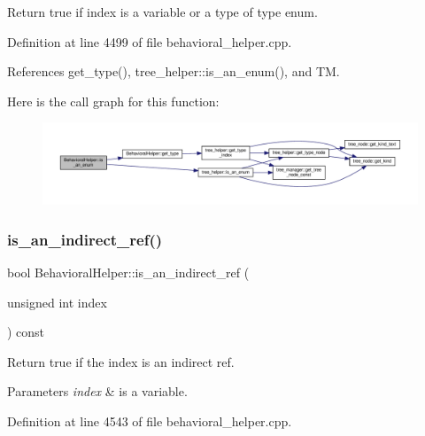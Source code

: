 Return true if index is a variable or a type of type enum. 



Definition at line 4499 of file behavioral\+\_\+helper.\+cpp.



References get\+\_\+type(), tree\+\_\+helper\+::is\+\_\+an\+\_\+enum(), and TM.

Here is the call graph for this function\+:
\nopagebreak
\begin{figure}[H]
\begin{center}
\leavevmode
\includegraphics[width=350pt]{dd/db2/classBehavioralHelper_a2b986a13b2680b8949a2221cad6820d7_cgraph}
\end{center}
\end{figure}
\mbox{\label{classBehavioralHelper_ab8596a332f4b4e31b86c750afec5b47f}} 
\subsubsection{\texorpdfstring{is\+\_\+an\+\_\+indirect\+\_\+ref()}{is\_an\_indirect\_ref()}}
{\footnotesize\ttfamily bool Behavioral\+Helper\+::is\+\_\+an\+\_\+indirect\+\_\+ref (\begin{DoxyParamCaption}\item[{unsigned int}]{index }\end{DoxyParamCaption}) const\hspace{0.3cm}{\ttfamily [virtual]}}



Return true if the index is an indirect ref. 


\begin{DoxyParams}{Parameters}
{\em index} & is a variable. \\
\hline
\end{DoxyParams}


Definition at line 4543 of file behavioral\+\_\+helper.\+cpp.



